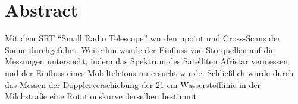 \section{Abstract}
Mit dem SRT \enquote{Small Radio Telescope} wurden npoint und Cross-Scans der Sonne durchgeführt. Weiterhin wurde der Einfluss von Störquellen auf die Messungen untersucht, indem das Spektrum des Satelliten Afristar vermessen und der Einfluss eines Mobiltelefons untersucht wurde. Schließlich wurde durch das Messen der Dopplerverschiebung der 21 cm-Wasserstofflinie in der Milchstraße eine Rotationskurve derselben bestimmt.